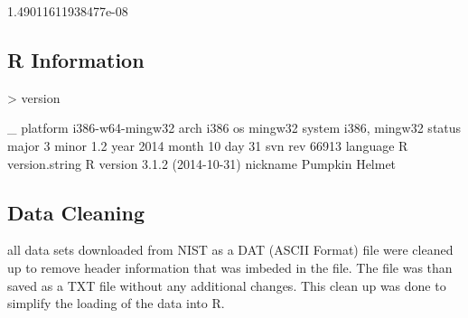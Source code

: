 \documentclass[10pt]{article}
\begin{document}
\begin{Schunk}
\begin{Soutput}
[1] 1.49011611938477e-08
\end{Soutput}
\end{Schunk}
\subsection{R Information}
\begin{Schunk}
\begin{Sinput}
> version
\end{Sinput}
\begin{Soutput}
               _                           
platform       i386-w64-mingw32            
arch           i386                        
os             mingw32                     
system         i386, mingw32               
status                                     
major          3                           
minor          1.2                         
year           2014                        
month          10                          
day            31                          
svn rev        66913                       
language       R                           
version.string R version 3.1.2 (2014-10-31)
nickname       Pumpkin Helmet              
\end{Soutput}
\end{Schunk}

\subsection{Data Cleaning}
all data sets downloaded from NIST as a DAT (ASCII Format) file were cleaned up 
to remove header information that was imbeded in the file. The file was than saved
as a TXT file without any additional changes. This clean up was done to simplify 
the loading of the data into R.
\end{document}

